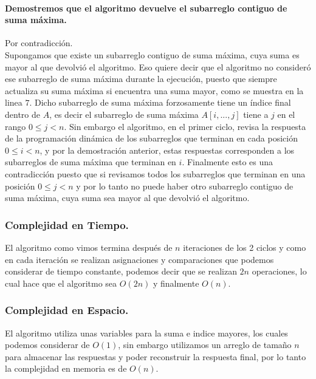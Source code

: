 \documentclass[12pt]{article}
\begin{document}
\paragraph{Demostremos que el algoritmo devuelve el subarreglo contiguo de suma máxima.}
Por contradicción.\\
Supongamos que existe un subarreglo contiguo de suma máxima, cuya suma es mayor al que devolvió el algoritmo. Eso quiere decir que el algoritmo no consideró ese subarreglo de suma máxima durante la ejecución, puesto que siempre actualiza su suma máxima si encuentra una suma mayor, como se muestra en la linea $7$. Dicho subarreglo de suma máxima forzosamente tiene un índice final dentro de $A$, es decir el subarreglo de suma máxima $A[i,...,j]$ tiene a $j$ en el rango $0\leq j < n$. Sin embargo el algoritmo, en el primer ciclo, revisa la respuesta de la programación dinámica de los subarreglos que terminan en cada posición $0\leq i < n$, y por la demostración anterior, estas respuestas corresponden a los subarreglos de suma máxima que terminan en $i$. Finalmente esto es una contradicción puesto que si revisamos todos los subarreglos que terminan en una posición $0\leq j < n$ y por lo tanto no puede haber otro subarreglo contiguo de suma máxima, cuya suma sea mayor al que devolvió el algoritmo.\\
\subsubsection{Complejidad en Tiempo.}
El algoritmo como vimos termina después de $n$ iteraciones de los 2 ciclos y como en cada iteración se realizan asignaciones y comparaciones que podemos considerar de tiempo constante, podemos decir que se realizan $2n$ operaciones, lo cual hace que el algoritmo sea $O(2n)$ y finalmente $O(n)$.
 \subsubsection{Complejidad en Espacio.}
 El algoritmo utiliza unas variables para la suma e indice mayores, los cuales podemos considerar de $O(1)$, sin embargo utilizamos un arreglo de tamaño $n$ para almacenar las respuestas y poder reconstruir la respuesta final, por lo tanto la complejidad en memoria es de $O(n)$.
\end{document}
